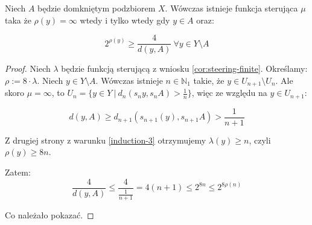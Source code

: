 \begin{cor}
  Niech $A$ będzie domkniętym podzbiorem $X$. Wówczas istnieje funkcja sterująca $\mu$ taka że $\rho(y) = \infty$ wtedy i tylko wtedy gdy $y \in A$ oraz:
  
  \[2^{\rho(y)} \geq \frac{4}{d(y,A)}\ \forall y \in Y \setminus A\]
  
  \begin{proof}
    Niech $\lambda$ będzie funkcją sterującą z wniosku \eqref{cor:steering-finite}. Określamy: $\rho := 8 \cdot \lambda$.
    Niech $y \in Y \setminus A$. Wówczas istnieje $n \in \mathbb{N}_1$ takie, że $y \in U_{n+1} \setminus U_n$. Ale skoro $\mu = \infty$, to $U_n = \{y \in Y\ |\ d_n(s_n y, s_n A) > \frac{1}{n}\}$, więc ze względu na $y \in U_{n+1}$:
    
    \[d(y, A) \geq d_{n+1}(s_{n+1}(y), s_{n+1} A) > \frac{1}{n+1}\]
    
    Z drugiej strony z warunku \eqref{induction-3} otrzymujemy $\lambda(y) \geq n$, czyli $\rho(y) \geq 8n$.
    
    Zatem:
    \[\frac{4}{d(y,A)} \leq \frac{4}{\frac{1}{n+1}} = 4(n+1) \leq 2^{8n} \leq 2^{8 \rho(n)}\]
    
    Co należało pokazać.
  \end{proof}
\end{cor}


